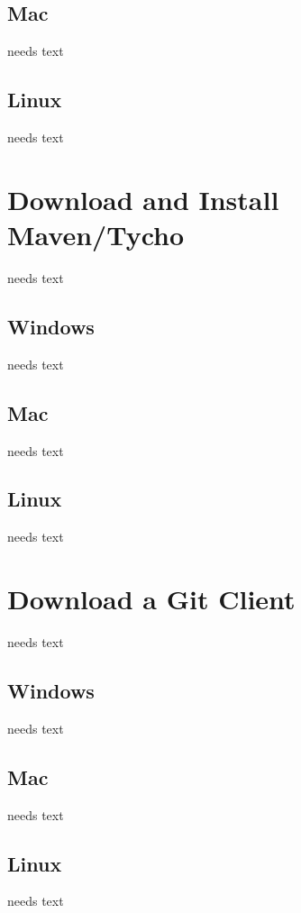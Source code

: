 \documentclass[a4paper,10pt,twoside]{book}
\begin{document}
\subsection{Mac}
needs text

\subsection{Linux}
needs text

\section{Download and Install Maven/Tycho}
needs text

\subsection{Windows}
needs text

\subsection{Mac}
needs text

\subsection{Linux}
needs text

\section{Download a Git Client}
needs text

\subsection{Windows}
needs text

\subsection{Mac}
needs text

\subsection{Linux}
needs text


\ifx\wholebook\relax\else
   
   
\end{document}
